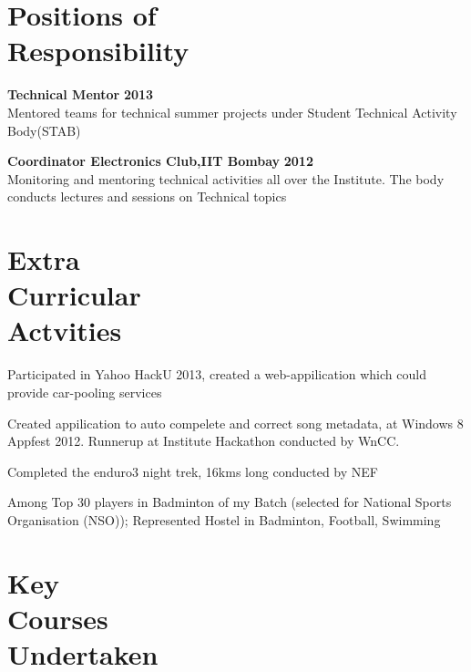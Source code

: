 \documentclass[margin,11pt]{resume}
\begin{document}
\begin{resume}
\section{\mysidestyle Positions of\\ Responsibility}

\begin{list2}
\item \textbf{Technical Mentor} \hfill\textbf{2013}\\
				Mentored teams for technical summer projects under Student Technical Activity Body(STAB)
\item \textbf{Coordinator Electronics Club,IIT Bombay} \hfill \textbf{2012}\\
				Monitoring and mentoring technical activities all over the Institute. The body conducts lectures and sessions on Technical topics
\end{list2}

\vspace{-1mm}
\section{\mysidestyle Extra\\Curricular\\Actvities}
\begin{list2}
\item Participated in  Yahoo HackU  2013, created a web-appilication which could provide car-pooling services
\item Created appilication to  auto compelete and correct song metadata, at Windows 8 Appfest 2012. Runnerup at Institute Hackathon conducted by WnCC.			
\item Completed the enduro3 night trek, 16kms long conducted by NEF
\item Among Top 30 players in Badminton of my Batch (selected for National Sports Organisation (NSO)); Represented Hostel in Badminton, Football, Swimming
\end{list2}

\vspace{-1mm}
\section{\mysidestyle Key\\ Courses\\ Undertaken}


\end{resume}
\end{document}
